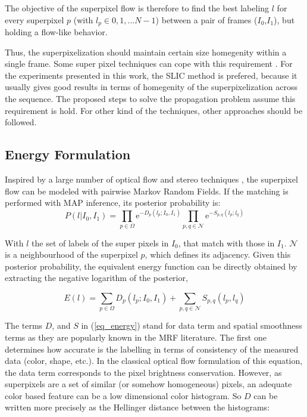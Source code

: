 The objective of the superpixel flow is therefore to find the best labeling $l$ for every superpixel $p$
(with $l_p \in {0,1,...N-1}$) between a pair of frames ($I_{0}$,$I_{1}$), but holding a flow-like behavior.

Thus, the superpixelization should maintain certain size homegenity within a single frame. Some super
pixel techniques can cope with this requirement \cite{c9}\cite{c10}. For the experiments presented 
in this work, the SLIC method \cite{c9} is prefered, because it usually gives
good results in terms of homegenity of the superpixelization across the sequence. 
The proposed steps to solve the propagation problem assume this requirement is hold. 
For other kind of the techniques, other approaches should be followed.


\subsection{Energy Formulation}

Inspired by a large number of optical flow and stereo techniques \cite{c7}\cite{c12}\cite{c13}, 
the superpixel flow can be modeled with pairwise Markov Random Fields. If
the matching is performed with MAP inference, its posterior probability is: 
\begin{equation}
P(l|I_0,I_1) = \displaystyle \prod_{p \in \Omega} \mathrm{e}^{-D_p(l_p;I_0,I_1)} 
\prod_{p,q \in \mathcal{N}} \mathrm{e}^{-S_{p,q}(l_p;l_q)} 
\label{eq_prob}
\end{equation}

With $l$ the set of labels of the super pixels in $I_0$,
that match with those in $I_1$.
$ \mathcal{N} $ is a neighbourhood of the
superpixel $p$, which defines its adjacency. Given this posterior probability,
the equivalent energy function can be directly obtained
by extracting the negative logarithm of the posterior,

\begin{equation}
E(l) = \displaystyle \sum_{p \in \Omega} D_p(l_p;I_0,I_1) +
\sum_{p,q \in \mathcal{N}} S_{p,q}(l_p,l_q)
\label{eq_energy}
\end{equation}

The terms $D$, and $S$ in (\ref{eq_energy}) stand for data term and spatial smoothness terms as they
are popularly known in the MRF literature. The first one determines how accurate is the labelling in terms
of consistency of the measured data (color, shape, etc.). In the classical optical flow formulation of this equation,
the data term corresponds to the pixel brightness conservation\cite{c7}\cite{c5}. However, as superpixels are a set
of similar (or somehow homogeneous) pixels, an adequate color based feature can be a low dimensional
color histogram. So $D$ can be written more precisely as the Hellinger distance between the histograms:

